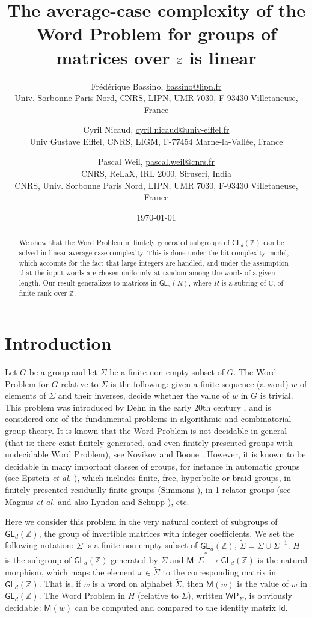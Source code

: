 \documentclass{article}
\title{The average-case complexity of the Word Problem for groups of matrices over $\Z$ is linear}
\author{
    Fr\'ed\'erique Bassino, \small{\url{bassino@lipn.fr}}\\
    \small{Univ. Sorbonne Paris Nord, CNRS, LIPN, UMR 7030, F-93430 Villetaneuse, France}%
    \and
    Cyril Nicaud, \small{\url{cyril.nicaud@univ-eiffel.fr}}\\
    \small{Univ Gustave Eiffel, CNRS, LIGM, F-77454 Marne-la-Vallée, France}%
%
    \and
    Pascal Weil, \small{\url{pascal.weil@cnrs.fr}}\\
    \small{CNRS, ReLaX, IRL 2000, Siruseri, India}\\
    \small{CNRS, Univ. Sorbonne Paris Nord, LIPN, UMR 7030, F-93430 Villetaneuse, France}%
    }
\date{\today}
\def\alph{\tilde{\Sigma}}
\def\Id{\textsf{Id}}
\def\C{\mathbb{C}}
\def\Z{\mathbb{Z}}
\def\GL{\textsf{GL}}
\def\WP{\textsf{WP}}
\def\mat{\textsf{M}}
\theoremstyle{plain}
\theoremstyle{definition}
\begin{document}
\maketitle

\begin{abstract}
    We show that the Word Problem in finitely generated subgroups of $\GL_d(\Z)$ can be solved in linear average-case complexity. This is done under the bit-complexity model, which accounts for the fact that large integers are handled, and under the assumption that the input words are chosen uniformly at random among the words of a given length. Our result generalizes to matrices in $\GL_d(R)$, where $R$ is a subring of $\C$, of finite rank over $\Z$.
\end{abstract}


\section{Introduction}


Let $G$ be a group and let $\Sigma$ be a finite non-empty subset of $G$. The Word Problem for $G$ relative to $\Sigma$ is the following: given a finite sequence (a word) $w$ of elements of $\Sigma$ and their inverses, decide whether the value of $w$ in $G$ is trivial. This problem was introduced by Dehn in the early 20th century \cite{1911:Dehn}, and is considered one of the fundamental problems in algorithmic and combinatorial group theory. It is known that the Word Problem is not decidable in general (that is: there exist finitely generated, and even finitely presented groups with undecidable Word Problem), see Novikov \cite{1955:Novikov}
and Boone \cite{1959:Boone}. However, it is known to be decidable in many important classes of groups, for instance in automatic groups (see Epstein \emph{et al.} \cite{1992:Epsteinetal}),
which includes finite, free, hyperbolic or braid groups, in finitely presented residually finite groups (Simmons \cite{1973:Simmons}), in 1-relator groups (see Magnus \emph{et al.} \cite[Theorem 4.14]{1966:MagnusKS} and also Lyndon and Schupp \cite{1977:LyndonSchupp}), etc.

Here we consider this problem in the very natural context of subgroups of $\GL_d(\Z)$, the group of invertible matrices with integer coefficients. We set the following notation: $\Sigma$ is a finite non-empty subset of $\GL_d(\Z)$, $\alph = \Sigma \cup \Sigma^{-1}$, $H$ is the subgroup of $\GL_d(\Z)$ generated by $\Sigma$ and $\mat\colon \alph^* \to \GL_d(\Z)$ is the natural morphism, which maps the element $x \in \alph$ to the corresponding matrix in $\GL_d(\Z)$. That is, if $w$ is a word on alphabet $\alph$, then $\mat(w)$ is the value of $w$ in $\GL_d(\Z)$. The Word Problem in $H$ (relative to $\Sigma$), written $\WP_\Sigma$, is obviously decidable: $\mat(w)$ can be computed and compared to the identity matrix $\Id$.
\end{document}
